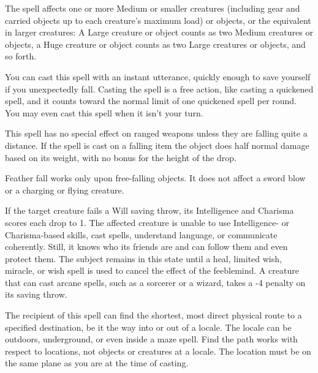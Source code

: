 \begin{multicols}{2}
\begin{small}
\smallskip\noindent The spell affects one or more Medium or smaller creatures (including gear and carried objects up to each creature's maximum load) or objects, or the equivalent in larger creatures: A Large creature or object counts as two Medium creatures or objects, a Huge creature or object counts as two Large creatures or objects, and so forth.

\smallskip\noindent You can cast this spell with an instant utterance, quickly enough to save yourself if you unexpectedly fall. Casting the spell is a free action, like casting a quickened spell, and it counts toward the normal limit of one quickened spell per round. You may even cast this spell when it isn't your turn.

\smallskip\noindent This spell has no special effect on ranged weapons unless they are falling quite a distance. If the spell is cast on a falling item the object does half normal damage based on its weight, with no bonus for the height of the drop.

\smallskip\noindent Feather fall works only upon free-falling objects. It does not affect a sword blow or a charging or flying creature.

\noindent If the target creature fails a Will saving throw, its Intelligence and Charisma scores each drop to 1. The affected creature is unable to use Intelligence- or Charisma-based skills, cast spells, understand language, or communicate coherently. Still, it knows who its friends are and can follow them and even protect them. The subject remains in this state until a heal, limited wish, miracle, or wish spell is used to cancel the effect of the feeblemind. A creature that can cast arcane spells, such as a sorcerer or a wizard, takes a -4 penalty on its saving throw.


\noindent The recipient of this spell can find the shortest, most direct physical route to a specified destination, be it the way into or out of a locale. The locale can be outdoors, underground, or even inside a maze spell. Find the path works with respect to locations, not objects or creatures at a locale. The location must be on the same plane as you are at the time of casting.


\end{small}
\end{multicols}
